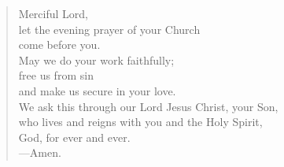 \prayer

\setlength{\leftmargini}{\prayerleftmargini}

\begin{verse}
Merciful Lord,\\
let the evening prayer of your Church\\
come before you.\\
May we do your work faithfully;\\
free us from sin\\
and make us secure in your love.\\
We ask this through our Lord Jesus Christ, your Son,\\
who lives and reigns with you and the Holy Spirit,\\
God, for ever and ever.\\
{\color{red}---\thinspace}Amen.
\end{verse}

\setlength{\leftmargini}{\defleftmargini}